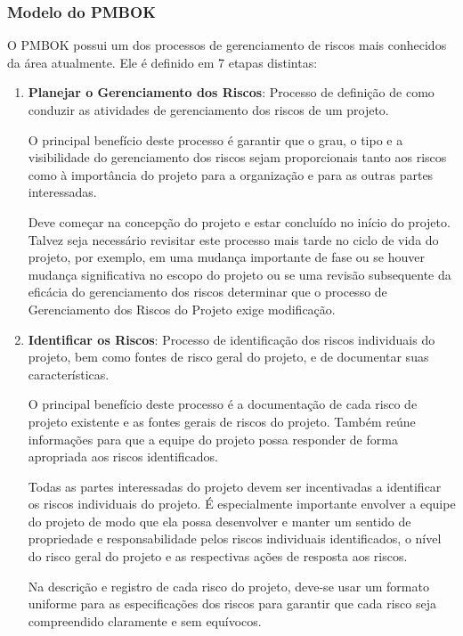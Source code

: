 \documentclass[
	12pt,
	openright,
	twoside,
	a4paper,
	english,
	brazil
	]{abntex2}
\begin{document}

\subsubsection{Modelo do PMBOK}

O PMBOK \cite{PMBOK} possui um dos  processos de gerenciamento de riscos mais conhecidos da área atualmente. Ele é definido em 7 etapas distintas:

\begin{enumerate}
  \item \textbf{Planejar o Gerenciamento dos Riscos}: Processo de definição de como conduzir as atividades de gerenciamento dos riscos de um projeto.

  O principal benefício deste processo é garantir que o grau, o tipo e a visibilidade do gerenciamento dos riscos sejam proporcionais tanto aos riscos como à importância do projeto para a organização e para as outras partes interessadas.  
  
  Deve começar na concepção do projeto e estar concluído no início do projeto. Talvez seja necessário revisitar este processo mais tarde no ciclo de vida do projeto, por exemplo, em uma mudança importante de fase ou se houver mudança significativa no escopo do projeto ou se uma revisão subsequente da eficácia do gerenciamento dos riscos determinar que o processo de Gerenciamento dos Riscos do Projeto exige modificação.

  \item \textbf{Identificar os Riscos}: Processo de identificação dos riscos individuais do projeto, bem como fontes de risco geral do projeto, e de documentar suas características.  
  
  O principal benefício deste processo é a documentação de cada risco de projeto existente e as fontes gerais de riscos do projeto. Também reúne informações para que a equipe do projeto possa responder de forma apropriada aos riscos identificados.  
  
  Todas as partes interessadas do projeto devem ser incentivadas a identificar os riscos individuais do projeto. É especialmente importante envolver a equipe do projeto de modo que ela possa desenvolver e manter um sentido de propriedade e responsabilidade pelos riscos individuais identificados, o nível do risco geral do projeto e as respectivas ações de resposta aos riscos.  

  Na descrição e registro de cada risco do projeto, deve-se usar um formato uniforme para as especificações dos riscos para garantir que cada risco seja compreendido claramente e sem equívocos.


\end{enumerate}
\end{document}
